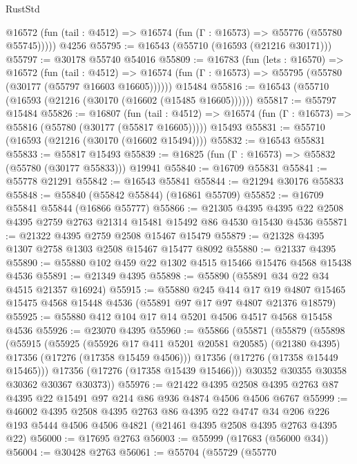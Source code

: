 \begin{lexlean}{RustStd}
\begin{coremodule}
      @16572 (fun (tail : @4512) => @16574 (fun (Γ : @16573) => @55776 (@55780 @55745)))))
    @4256
@55795 := @16543 (@55710 (@16593 (@21216 @30171)))
@55797 := @30178 @55740 @54016
@55809 := @16783
    (fun (lets : @16570) =>
    @16572
      (fun (tail : @4512) =>
      @16574 (fun (Γ : @16573) => @55795 (@55780 (@30177 (@55797 @16603 @16605))))))
    @15484
@55816 := @16543 (@55710 (@16593 (@21216 (@30170 (@16602 (@15485 @16605))))))
@55817 := @55797 @15484
@55826 := @16807
    (fun (tail : @4512) => @16574 (fun (Γ : @16573) => @55816 (@55780 (@30177 (@55817 @16605)))))
    @15493
@55831 := @55710 (@16593 (@21216 (@30170 (@16602 @15494))))
@55832 := @16543 @55831
@55833 := @55817 @15493
@55839 := @16825 (fun (Γ : @16573) => @55832 (@55780 (@30177 @55833))) @19941
@55840 := @16709 @55831
@55841 := @55778 @21291
@55842 := @16543 @55841
@55844 := @21294 @30176 @55833
@55848 := @55840 (@55842 @55844) (@16861 @55709)
@55852 := @16709 @55841 @55844 (@16866 @55777)
@55866 := @21305 @4395 @4395 @22 @2508 @4395 @2759 @2763 @21314 @15481 @15492 @86 @4530 @15430 @4536
@55871 := @21322 @4395 @2759 @2508 @15467 @15479
@55879 := @21328 @4395 @1307 @2758 @1303 @2508 @15467 @15477 @8092
@55880 := @21337 @4395
@55890 := @55880 @102 @459 @22 @1302 @4515 @15466 @15476 @4568 @15438 @4536
@55891 := @21349 @4395
@55898 := @55890 (@55891 @34 @22 @34 @4515 @21357 @16924)
@55915 := @55880
    @245
    @414
    @17
    @19
    @4807
    @15465
    @15475
    @4568
    @15448
    @4536
    (@55891 @97 @17 @97 @4807 @21376 @18579)
@55925 := @55880 @412 @104 @17 @14 @5201 @4506 @4517 @4568 @15458 @4536
@55926 := @23070 @4395
@55960 := @55866
    (@55871
      (@55879
        (@55898
          (@55915
            (@55925
              (@55926 @17 @411 @5201 @20581 @20585)
              (@21380 @4395)
              @17356
              (@17276 (@17358 @15459 @4506)))
            @17356
            (@17276 (@17358 @15449 @15465)))
          @17356
          (@17276 (@17358 @15439 @15466)))
        @30352
        @30355
        @30358
        @30362
        @30367
        @30373))
@55976 := @21422
    @4395
    @2508
    @4395
    @2763
    @87
    @4395
    @22
    @15491
    @97
    @214
    @86
    @936
    @4874
    @4506
    @4506
    @6767
@55999 := @46002
    @4395
    @2508
    @4395
    @2763
    @86
    @4395
    @22
    @4747
    @34
    @206
    @226
    @193
    @5444
    @4506
    @4506
    @4821
    (@21461 @4395 @2508 @4395 @2763 @4395 @22)
@56000 := @17695 @2763
@56003 := @55999 (@17683 (@56000 @34))
@56004 := @30428 @2763
@56061 := @55704
    (@55729
      (@55770

\end{coremodule}
\end{lexlean}

